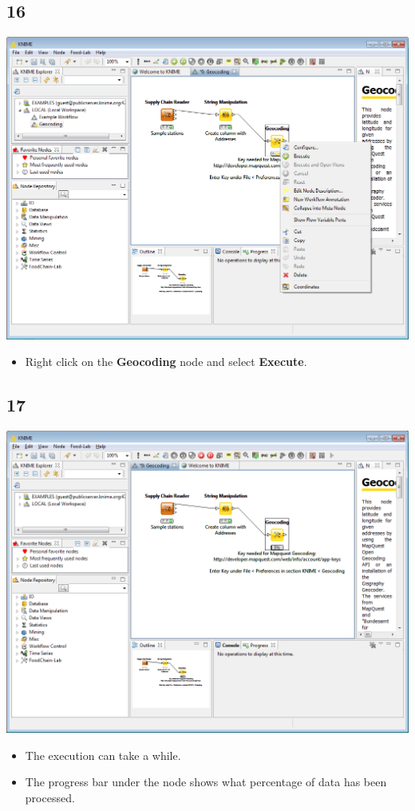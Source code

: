 \documentclass{beamer}
\begin{document}
\subsection{16}
\begin{frame}
	\begin{center}
  		\includegraphics[height=0.6\textheight]{16.png}
	\end{center}
	\begin{itemize}
		\item Right click on the \textbf{Geocoding} node and select \textbf{Execute}.
	\end{itemize}
\end{frame}

\subsection{17}
\begin{frame}
	\begin{center}
  		\includegraphics[height=0.6\textheight]{17.png}
	\end{center}
	\begin{itemize}
		\item The execution can take a while.
		\item The progress bar under the node shows what percentage of data has been processed.
	\end{itemize}
\end{frame}
\end{document}
